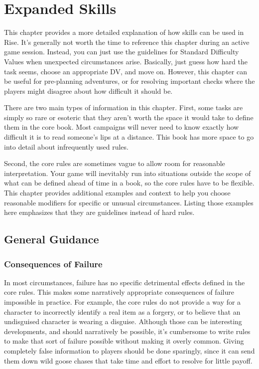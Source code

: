 \chapter{Expanded Skills}

This chapter provides a more detailed explanation of how skills can be used in Rise.
It's generally not worth the time to reference this chapter during an active game session.
Instead, you can just use the guidelines for Standard Difficulty Values when unexpected circumstances arise.
Basically, just guess how hard the task seems, choose an appropriate DV, and move on.
However, this chapter can be useful for pre-planning adventures, or for resolving important checks where the players might disagree about how difficult it should be.

There are two main types of information in this chapter.
First, some tasks are simply so rare or esoteric that they aren't worth the space it would take to define them in the core book.
Most campaigns will never need to know exactly how difficult it is to read someone's lips at a distance.
This book has more space to go into detail about infrequently used rules.

Second, the core rules are sometimes vague to allow room for reasonable interpretation.
Your game will inevitably run into situations outside the scope of what can be defined ahead of time in a book, so the core rules have to be flexible.
This chapter provides additional examples and context to help you choose reasonable modifiers for specific or unusual circumstances.
Listing those examples here emphasizes that they are guidelines instead of hard rules.

\section{General Guidance}

  \subsection{Consequences of Failure}
    In most circumstances, failure has no specific detrimental effects defined in the core rules.
    This makes some narratively appropriate consequences of failure impossible in practice.
    For example, the core rules do not provide a way for a character to incorrectly identify a real item as a forgery, or to believe that an undisguised character is wearing a disguise.
    Although those can be interesting developments, and should narratively be possible, it's cumbersome to write rules to make that sort of failure possible without making it overly common.
    Giving completely false information to players should be done sparingly, since it can send them down wild goose chases that take time and effort to resolve for little payoff.

